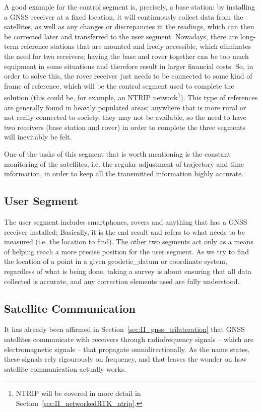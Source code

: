 A good example for the control segment is, precisely, a base station: by installing a GNSS receiver at a fixed location, it will continuously collect data from the satellites, as well as any changes or discrepancies in the readings, which can then be corrected later and transferred to the user segment. Nowadays, there are long-term reference stations that are mounted and freely accessible, which eliminates the need for two receivers; having the base and rover together can be too much equipment in some situations and therefore result in larger financial costs.
So, in order to solve this, the rover receiver just needs to be connected to some kind of frame of reference, which will be the control segment used to complete the solution (this could be, for example, an NTRIP network\footnote{NTRIP will be covered in more detail in Section~\ref{sec:II_networkedRTK_ntrip}.}).
This type of references are generally found in heavily populated areas; anywhere that is more rural or not really connected to society, they may not be available, so the need to have two receivers (base station and rover) in order to complete the three segments will inevitably be felt.

One of the tasks of this segment that is worth mentioning is the constant monitoring of the satellites, i.e. the regular adjustment of trajectory and time information, in order to keep all the transmitted information highly accurate.

\subsection{User Segment}\label{sec:II_gnss_user_seg}

The user segment includes smartphones, rovers and anything that has a GNSS receiver installed; Basically, it is the end result and refers to what needs to be measured (i.e. the location to find). The other two segments act only as a means of helping reach a more precise position for the user segment.
As we try to find the location of a point in a given \gls{geodetic_datum} or coordinate system, regardless of what is being done, taking a survey is about ensuring that all data collected is accurate, and any correction elements used are fully understood.

\subsection{Satellite Communication}\label{sec:II_gnss_comm}

It has already been affirmed in Section~\ref{sec:II_gnss_trilateration} that GNSS satellites communicate with receivers through radiofrequency signals -- which are electromagnetic signals -- that propagate omnidirectionally. As the name states, these signals rely rigourously on frequency, and that leaves the wonder on how satellite communication actually works.

